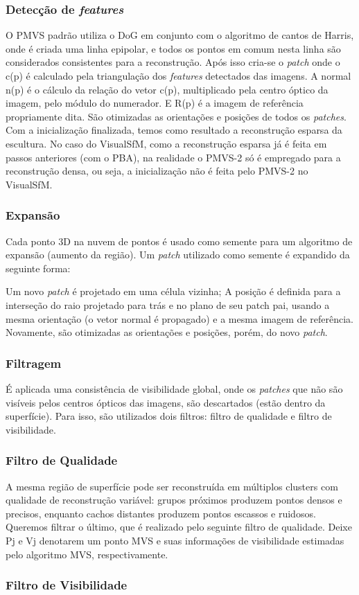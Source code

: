 \begin{itemize}
\subsubsection{Detecção de {\it features}}
O PMVS padrão utiliza o DoG em conjunto com o algoritmo de cantos de Harris, onde é criada uma linha epipolar, e todos os pontos em comum nesta linha são considerados consistentes para a reconstrução. 
Após isso cria-se o {\it patch} onde o c(p) é calculado pela triangulação dos {\it features} detectados das imagens. A normal n(p) é o cálculo da relação do vetor c(p), multiplicado pela centro óptico da imagem, pelo módulo do numerador. E R(p) é a imagem de referência propriamente dita. São otimizadas as orientações e posições de todos os {\it patches}.
Com a inicialização finalizada, temos como resultado a reconstrução esparsa da escultura. No caso do VisualSfM, como a reconstrução esparsa já é feita em passos anteriores (com o PBA), na realidade o PMVS-2 só é empregado para a reconstrução densa, ou seja, a inicialização não é feita pelo PMVS-2 no VisualSfM.

\subsubsection{Expansão}
Cada ponto 3D na nuvem de pontos é usado como semente para um algoritmo de expansão (aumento da região). Um {\it patch} utilizado como semente é expandido da seguinte forma:

Um novo {\it patch} é projetado em uma célula vizinha;
A posição é definida para a interseção do raio projetado para trás e no plano de seu patch pai, usando a mesma orientação (o vetor normal é propagado) e a mesma imagem de referência.
Novamente, são otimizadas as orientações e posições, porém, do novo {\it patch}.	

\subsubsection{Filtragem}
É aplicada uma consistência de visibilidade global, onde os {\it patches} que não são visíveis pelos centros ópticos das imagens, são descartados (estão dentro da superfície). Para isso, são utilizados dois filtros: filtro de qualidade e filtro de visibilidade.

\subsubsection{Filtro de Qualidade}

A mesma região de superfície pode ser reconstruída em múltiplos clusters com qualidade de reconstrução variável: grupos próximos produzem pontos densos e precisos, enquanto cachos distantes produzem pontos escassos e ruidosos. Queremos filtrar o último, que é realizado pelo seguinte filtro de qualidade. Deixe Pj e Vj denotarem um ponto MVS e suas informações de visibilidade estimadas pelo algoritmo MVS, respectivamente.

\subsubsection{Filtro de Visibilidade}

\end{itemize}
